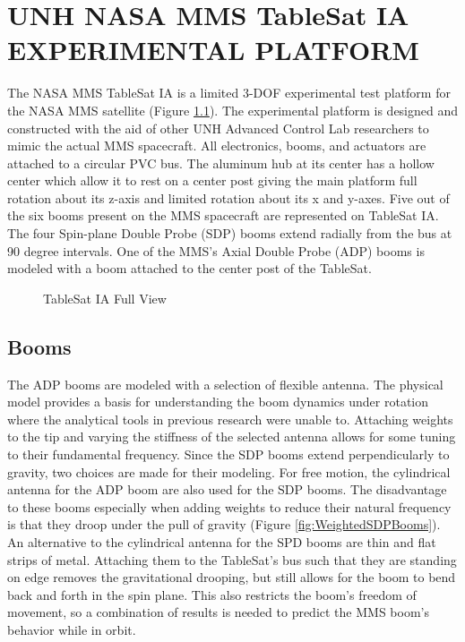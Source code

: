 
\chapter{UNH NASA MMS TableSat IA EXPERIMENTAL PLATFORM}
\label{chap:UNHTableSat1A}

The NASA MMS TableSat IA is a limited 3-DOF experimental test platform for the NASA MMS satellite (Figure \ref{fig:TSatFullView}).  The experimental platform is designed and constructed with the aid of other UNH Advanced Control Lab researchers to mimic the actual MMS spacecraft.  All electronics, booms, and actuators are attached to a circular PVC bus.  The aluminum hub at its center has a hollow center which allow it to rest on a center post giving the main platform full rotation about its z-axis and limited rotation about its x and y-axes.  Five out of the six booms present on the MMS spacecraft are represented on TableSat IA.  The four Spin-plane Double Probe (SDP) booms extend radially from the bus at 90 degree intervals.  One of the MMS's Axial Double Probe (ADP) booms is modeled with a boom attached to the center post of the TableSat.

\begin{figure}[H]
  \centerline{}
  \caption{TableSat IA Full View}
  \label{fig:TSatFullView}
\end{figure}

\section{Booms}
\label{sec:Booms}

The ADP booms are modeled with a selection of flexible antenna.  The physical model provides a basis for understanding the boom dynamics under rotation where the analytical tools in previous research \cite{mushawehthesis} were unable to.  Attaching weights to the tip and varying the stiffness of the selected antenna allows for some tuning to their fundamental frequency.  Since the SDP booms extend perpendicularly to gravity, two choices are made for their modeling.  For free motion, the cylindrical antenna for the ADP boom are also used for the SDP booms.  The disadvantage to these booms especially when adding weights to reduce their natural frequency is that they droop under the pull of gravity (Figure \ref{fig:WeightedSDPBooms}).  An alternative to the cylindrical antenna for the SPD booms are thin and flat strips of metal.  Attaching them to the TableSat's bus such that they are standing on edge removes the gravitational drooping, but still allows for the boom to bend back and forth in the spin plane.  This also restricts the boom's freedom of movement, so a combination of results is needed to predict the MMS boom's behavior while in orbit.



